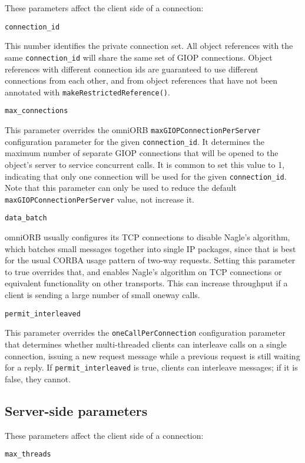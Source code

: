 \documentclass[11pt,oneside,a4paper]{book}
\makeatletter
\newcommand{\code}[1]{\texttt{#1}}
\newcommand{\op}[1]{\texttt{#1()}}
\newcommand{\confoptnd}[1]
  {\vspace{\baselineskip}\par\noindent\code{#1}}
\renewcommand{\confoptnd}[1]
  {\vspace{\baselineskip}\par\noindent\code{#1}\\[-1ex]\@afterheading}
\makeatother
\begin{document}
These parameters affect the client side of a connection:

\confoptnd{connection\_id}

This number identifies the private connection set. All object
references with the same \code{connection\_id} will share the same set
of GIOP connections. Object references with different connection ids
are guaranteed to use different connections from each other, and from
object references that have not been annotated with
\op{makeRestrictedReference}.

\confoptnd{max\_connections}

This parameter overrides the omniORB \code{maxGIOPConnectionPerServer}
configuration parameter for the given \code{connection\_id}. It
determines the maximum number of separate GIOP connections that will
be opened to the object's server to service concurrent calls. It is
common to set this value to 1, indicating that only one connection
will be used for the given \code{connection\_id}. Note that this
parameter can only be used to reduce the default
\code{maxGIOPConnectionPerServer} value, not increase it.

\confoptnd{data\_batch}

omniORB usually configures its TCP connections to disable Nagle's
algorithm, which batches small messages together into single IP
packages, since that is best for the usual CORBA usage pattern of
two-way requests. Setting this parameter to true overrides that, and
enables Nagle's algorithm on TCP connections or equivalent
functionality on other transports. This can increase throughput if a
client is sending a large number of small oneway calls.

\confoptnd{permit\_interleaved}

This parameter overrides the \code{oneCallPerConnection} configuration
parameter that determines whether multi-threaded clients can
interleave calls on a single connection, issuing a new request message
while a previous request is still waiting for a reply. If
\code{permit\_interleaved} is true, clients can interleave messages;
if it is false, they cannot.


\subsection{Server-side parameters}

These parameters affect the client side of a connection:

\confoptnd{max\_threads}
\end{document}
